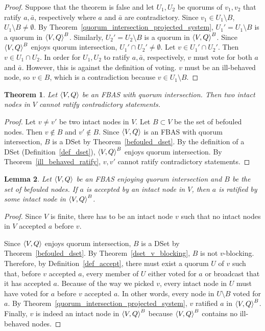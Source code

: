 \documentclass[12pt, psamsfonts]{amsart}
\newtheorem{thm}{Theorem}[section]
\newtheorem{lem}[thm]{Lemma}
\theoremstyle{definition}
\theoremstyle{remark}
\numberwithin{equation}{section}
\begin{document}
\begin{proof}
    Suppose that the theorem is false and let $U_1, U_2$ be quorums of $v_1, v_2$ that ratify $a, \bar{a}$, respectively where $a$ and $\bar{a}$ are contradictory.
    Since $v_1 \in U_1 \setminus B$,  $U_1 \setminus B \ne \emptyset$.
    By Theorem~\ref{quorum_intersection_projected_system}, $U_1' = U_1 \setminus B$ is a quorum in $\ev{V, Q}^B$.
    Similarly, $U_2' = U_2 \setminus B$ is a quorum in $\ev{V, Q}^B$.
    Since $\ev{V, Q}^B$ enjoys quorum intersection, $U_1' \cap U_2' \ne \emptyset$.
    Let $v \in U_1' \cap U_2'$.
    Then $v \in U_1 \cap U_2$.
    In order for $U_1, U_2$ to ratify $a, \bar{a}$, respectively, $v$ must vote for both $a$ and $\bar{a}$.
    However, this is against the definition of voting.
    $v$ must be an ill-behaved node, so $v \in B$, which is a contradiction because $v \in U_1 \setminus B$.
\end{proof}

\begin{thm}\label{intact_ratify_contradictory}
    Let $\ev{V, Q}$ be an FBAS with quorum intersection.
    Then two intact nodes in $V$ cannot ratify contradictory statements.
\end{thm}

\begin{proof}
    Let $v \ne v'$ be two intact nodes in $V$.
    Let $B \subset V$ be the set of befouled nodes.
    Then $v \notin B$ and $v' \notin B$.
    Since $\ev{V, Q}$ is an FBAS with quorum intersection, $B$ is a DSet by Theorem~\ref{befouled_dset}.
    By the definition of a DSet (Definition~\ref{def_dset}), $\ev{V, Q}^B$ enjoys quorum intersection.
    By Theorem~\ref{ill_behaved_ratify}, $v, v'$ cannot ratify contradictory statements.
\end{proof}

\begin{lem}\label{lem_intact_ratify}
    Let $\ev{V, Q}$ be an FBAS enjoying quorum intersection and $B$ be the set of befouled nodes.
    If $a$ is accepted by an intact node in $V$, then $a$ is ratified by some intact node in $\ev{V, Q}^B$.
\end{lem}

\begin{proof}
    Since $V$ is finite, there has to be an intact node $v$ such that no intact nodes in $V$ accepted $a$ before $v$.

    Since $\ev{V, Q}$ enjoys quorum intersection, $B$ is a DSet by Theorem~\ref{befouled_dset}.
    By Theorem~\ref{dset_v_blocking}, $B$ is not $v$-blocking.
    Therefore, by Definition~\ref{def_accept}, there must exist a quorum $U$ of $v$ such that, before $v$ accepted $a$, every member of $U$ either voted for $a$ or broadcast that it has accepted $a$.
    Because of the way we picked $v$, every intact node in $U$ must have voted for $a$ before $v$ accepted $a$.
    In other words, every node in $U \setminus B$ voted for $a$.
    By Theorem~\ref{quorum_intersection_projected_system}, $v$ ratified $a$ in ${\ev{V, Q}}^B$.
    Finally, $v$ is indeed an intact node in ${\ev{V, Q}}^B$ because ${\ev{V, Q}}^B$ contains no ill-behaved nodes.
\end{proof}
\end{document}
